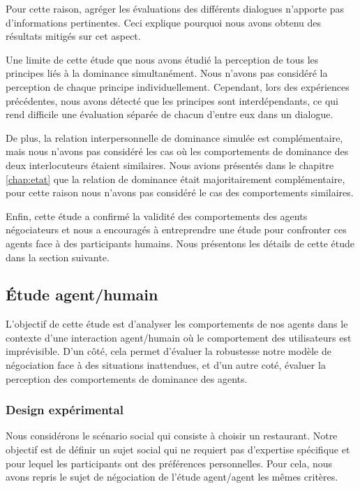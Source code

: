 {			Pour cette raison, agréger les évaluations des différents dialogues n'apporte pas d'informations pertinentes. Ceci explique pourquoi nous avons obtenu des résultats mitigés sur cet aspect.
			
			Une limite de cette étude que nous avons étudié la perception de tous les principes liés à la dominance simultanément. Nous n'avons pas considéré la perception de chaque principe individuellement. Cependant, lors des expériences précédentes, nous avons détecté que les principes sont interdépendants, ce qui rend difficile une évaluation séparée de chacun d'entre eux dans un dialogue.
			
			De plus, la relation interpersonnelle de dominance simulée est complémentaire, mais nous n'avons pas considéré les cas où les comportements de dominance des deux interlocuteurs étaient similaires. Nous avions présentés dans le chapitre \ref{chap:etat} que la relation de dominance était majoritairement complémentaire, pour cette raison nous n'avons pas considéré le cas des comportements similaires. 
			
			Enfin, cette étude a confirmé la validité des comportements des agents négociateurs et nous a encouragés à entreprendre une étude pour confronter ces agents face à des participants humains. Nous présentons les détails de cette étude dans la section suivante.
			
			
		\subsection{Étude agent/humain}
		
				L'objectif de cette étude est d'analyser les comportements de nos agents dans le contexte d'une interaction agent/humain où le comportement des utilisateurs est imprévisible. D'un côté, cela permet d'évaluer la robustesse notre modèle de négociation face à des situations inattendues, et d'un autre coté, évaluer la perception des comportements de dominance des agents. 
				
				\subsubsection{Design expérimental}
				
				Nous considérons le scénario social qui consiste à choisir un restaurant. Notre objectif est de définir un sujet social qui ne requiert pas d'expertise spécifique et pour lequel les participants ont des préférences personnelles. Pour cela, nous avons repris le sujet de négociation de l'étude agent/agent les mêmes critères.
				
}
